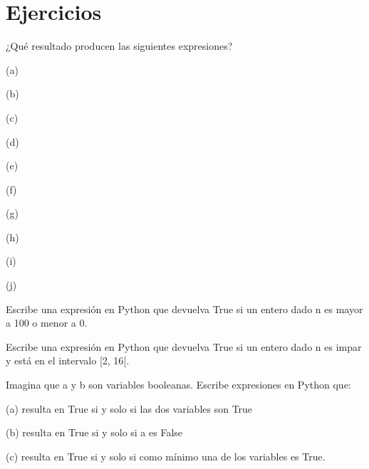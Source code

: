 
\hypertarget{ejercicios}{%
\section*{Ejercicios}\label{ejercicios}}


\begin{ejercicio}¿Qué resultado producen las siguientes expresiones?

(a)  

(b) 

(c) 

(d) 

(e) 

(f) 

(g) 

(h) 

(i) 

(j)  
\end{ejercicio}



\begin{ejercicio}Escribe una expresión en Python que devuelva True si un entero dado n es mayor a 100 o menor a 0.
\end{ejercicio}

\begin{ejercicio}Escribe una expresión en Python que devuelva True si un entero dado n es impar y está en el intervalo [2, 16[.
\end{ejercicio}

\begin{ejercicio}Imagina que a y b son variables booleanas. Escribe expresiones en Python que:

(a) resulta en True si y solo si las dos variables son True

(b) resulta en True si y solo si a es False

(c) resulta en True si y solo si como mínimo una de los variables es True.
\end{ejercicio}


